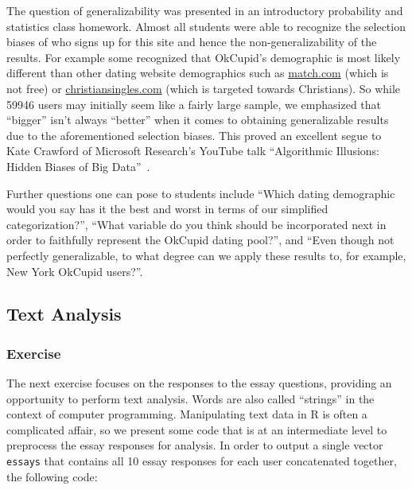 \documentclass{article}\usepackage[]{graphicx}\usepackage[]{color}
\begin{document}
The question of generalizability was presented in an introductory probability and statistics class homework.  Almost all students were able to recognize the selection biases of who signs up for this site and hence the non-generalizability of the results.  For example some recognized that OkCupid's demographic is most likely different than other dating website demographics such as \url{match.com} (which is not free) or \url{christiansingles.com} (which is targeted towards Christians).  So while 59946 users may initially seem like a fairly large sample, we emphasized that ``bigger'' isn't always ``better'' when it comes to obtaining generalizable results due to the aforementioned selection biases.  This proved an excellent segue to Kate Crawford of Microsoft Research's YouTube talk ``Algorithmic Illusions: Hidden Biases of Big Data''~\cite{Strata}.

Further questions one can pose to students include ``Which dating demographic would you say has it the best and worst in terms of our simplified categorization?'', ``What variable do you think should be incorporated next in order to faithfully represent the OkCupid dating pool?'',  and ``Even though not perfectly generalizable, to what degree can we apply these results to, for example, New York OkCupid users?''.







\subsection{Text Analysis}\label{essays}
\subsubsection{Exercise}
The next exercise focuses on the responses to the essay questions, providing an opportunity to perform text analysis.  Words are also called ``strings'' in the context of computer programming.  Manipulating text data in R is often a complicated affair, so we present some code that is at an intermediate level to preprocess the essay responses for analysis.  In order to output a single vector \verb#essays# that contains all 10 essay responses for each user concatenated together, the following code:
\end{document}
